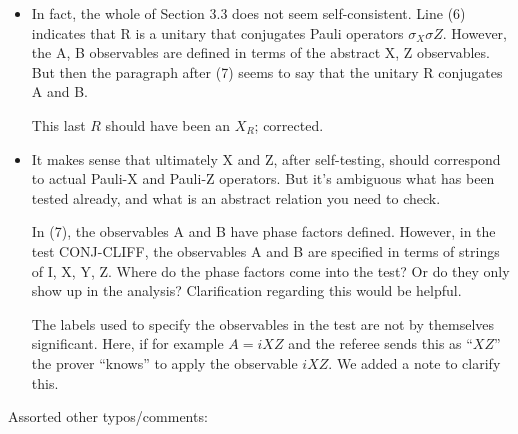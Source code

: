 \documentclass[12pt]{article}
\begin{document}
\begin{itemize}
\item 
In fact, the whole of Section 3.3 does not seem self-consistent. Line (6) indicates that R is a unitary that conjugates Pauli operators $\sigma_X \sigma Z$. However, the A, B observables are defined in terms of the abstract X, Z observables. But then the paragraph after (7) seems to say that the unitary R conjugates A and B. 

{\color{blue} This last $R$ should have been an $X_R$; corrected.}

\item 
It makes sense that ultimately X and Z, after self-testing, should correspond to actual Pauli-X and Pauli-Z operators. But it’s ambiguous what has been tested already, and what is an abstract relation you need to check. 

In (7), the observables A and B have phase factors defined. However, in the test CONJ-CLIFF, the observables A and B are specified in terms of strings of I, X, Y, Z. Where do the phase factors come into the test? Or do they only show up in the analysis? Clarification regarding this would be helpful.

{\color{blue} The labels used to specify the observables in the test are not by themselves significant. Here, if for example $A = iXZ$ and the referee sends this as ``$XZ$'' the prover ``knows'' to apply the observable $iXZ$. We added a note to clarify this.}

\end{itemize}

Assorted other typos/comments:
\end{document}
